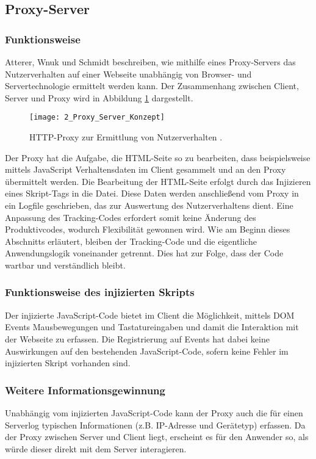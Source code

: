 \subsection{Proxy-Server}

\subsubsection{Funktionsweise}
\label{subsec:proxy_server}
Atterer, Wnuk und Schmidt \cite{atterer2006knowing} beschreiben, wie mithilfe eines Proxy-Servers das Nutzerverhalten auf einer Webseite unabhängig von Browser- und Servertechnologie ermittelt werden kann. Der Zusammenhang zwischen Client, Server und Proxy wird in Abbildung \ref{fig:proxy_server_concept} dargestellt.

\begin{figure}[H]
\centering
\texttt{[image: 2\_Proxy\_Server\_Konzept]}
\caption{HTTP-Proxy zur Ermittlung von Nutzerverhalten \cite{atterer2006knowing}.}
\label{fig:proxy_server_concept}
\end{figure}

Der Proxy hat die Aufgabe, die HTML-Seite so zu bearbeiten, dass beispielsweise mittels JavaScript Verhaltensdaten im Client gesammelt und an den Proxy übermittelt werden. Die Bearbeitung der HTML-Seite erfolgt durch das Injizieren eines Skript-Tags in die Datei. Diese Daten werden anschließend vom Proxy in ein Logfile geschrieben, das zur Auswertung des Nutzerverhaltens dient. Eine Anpassung des Tracking-Codes erfordert somit keine Änderung des Produktivcodes, wodurch Flexibilität gewonnen wird. Wie am Beginn dieses Abschnitts erläutert, bleiben der Tracking-Code und die eigentliche Anwendungslogik voneinander getrennt. Dies hat zur Folge, dass der Code wartbar und verständlich bleibt.

\subsubsection{Funktionsweise des injizierten Skripts}
Der injizierte JavaScript-Code bietet im Client die Möglichkeit, mittels DOM Events \cite{mdn2025_domevents} Mausbewegungen und Tastatureingaben und damit die Interaktion mit der Webseite zu erfassen. Die Registrierung auf Events hat dabei keine Auswirkungen auf den bestehenden JavaScript-Code, sofern keine Fehler im injizierten Skript vorhanden sind.

\subsubsection{Weitere Informationsgewinnung}
Unabhängig vom injizierten JavaScript-Code kann der Proxy auch die für einen Serverlog typischen Informationen (z.B. IP-Adresse und Gerätetyp) erfassen. Da der Proxy zwischen Server und Client liegt, erscheint es für den Anwender so, als würde dieser direkt mit dem Server interagieren.

